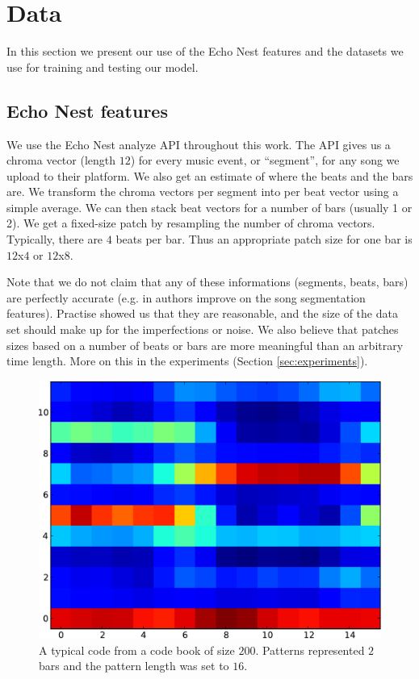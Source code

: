 \documentclass{article}
\begin{document}
\section{Data}\label{sec:data}
In this section we present our use of the Echo Nest features and the
datasets we use for training and testing our model.


\subsection{Echo Nest features}
We use the Echo Nest analyze API \cite{EchoNest} throughout this work.
The API gives us a chroma vector (length $12$) for every music event, 
or ``segment'', for any song we upload to their platform. 
We also get an estimate of where the beats and the bars are. 
We transform the chroma vectors per segment into per beat vector using a 
simple average. We can then stack beat vectors for a number of bars (usually 1 or 2). 
We get a fixed-size patch by resampling the number of chroma vectors. Typically,
there are $4$ beats per bar. Thus an appropriate patch size for one bar
is $12$x$4$ or $12$x$8$.

Note that we do not claim that any of these informations (segments, beats, bars)
are perfectly accurate (e.g. in \cite{Barrington2009a} authors improve on the
song segmentation features). Practise showed us that they are reasonable, 
and the size of the data set should make up for the imperfections or noise.
We also believe that patches sizes based on a number of beats or bars are more
meaningful than an arbitrary time length. More on this in the experiments
(Section \ref{sec:experiments}).


\begin{figure}[htb]
\begin{center}
\includegraphics[width=.8\columnwidth]{code}
\end{center}
\caption{{A typical code from a code book of size $200$. Patterns represented
$2$ bars and the pattern length was set to $16$.}}
\label{fig:code}
\end{figure}
\end{document}
